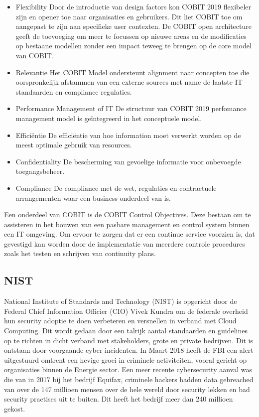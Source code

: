 \begin{itemize}
    \item Flexibility
    Door de introductie van design factors kon COBIT 2019 flexibeler zijn en opener toe naar organisaties en gebruikers. Dit liet COBIT toe om aangepast te zijn aan specifieke user contexten. De COBIT open architecture geeft de toevoeging om meer te focussen op nieuwe areas en de modificaties op bestaane modellen zonder een impact teweeg te brengen op de core model van COBIT. \autocite{Mikkola2021}
    \item Relevantie
    Het COBIT Model ondersteunt alignment naar concepten toe die oorspronkelijk afstammen van een externe sources met name de laatste IT standaarden en compliance regulaties. \autocite{Khther2013}
    \item Performance Management of IT 
    De structuur van COBIT 2019 perfomance management model is geïntegreerd in het conceptuele model.
    \item Efficiëntie
    De efficiëntie van hoe information moet verwerkt worden op de meest optimale gebruik van resources.
    \item Confidentiality
    De bescherming van gevoelige informatie voor onbevoegde toegangsbeheer.
    \item Compliance
    De compliance met de wet, regulaties en contractuele arrangementen waar een business onderdeel van is.
\end{itemize}

Een onderdeel van COBIT is de COBIT Control Objectives. Deze bestaan om te assisteren in het bouwen van een pasbare management en control system binnen een IT omgeving. \autocite{Khther2013} 
Om ervoor te zorgen dat er een continue service voorzien is, dat gevestigd kan worden door de implementatie van meerdere controle procedures zoals het testen en schrijven van continuity plans. \autocite{Khther2013} 


\subsection{NIST}
National Institute of Standards and Technology (NIST) is opgericht door de Federal Chief Information Officier (CIO) Vivek Kundra om de federale overheid hun security adoptie te doen verbeteren en versnellen in verband met Cloud Computing.
Dit wordt gedaan door een talrijk aantal standaarden en guidelines op te richten in dicht verband met stakeholders, grote en private bedrijven. \autocite{Hogan2011}
Dit is ontstaan door voorgaande cyber incidenten. In Maart 2018 heeft de FBI een alert uitgestuurd omtrent een hevige groei in criminele activiteiten, vooral gericht op organisaties binnen de Energie sector.
Een meer recente cybersecurity aanval was die van in 2017 bij het bedrijf Equifax, criminele hackers hadden data gebreached van over de 147 millioen mensen over de hele wereld door security lekken en bad security practises uit te buiten. Dit heeft het bedrijf meer dan 240 millioen gekost. \autocite{Calder2018}

